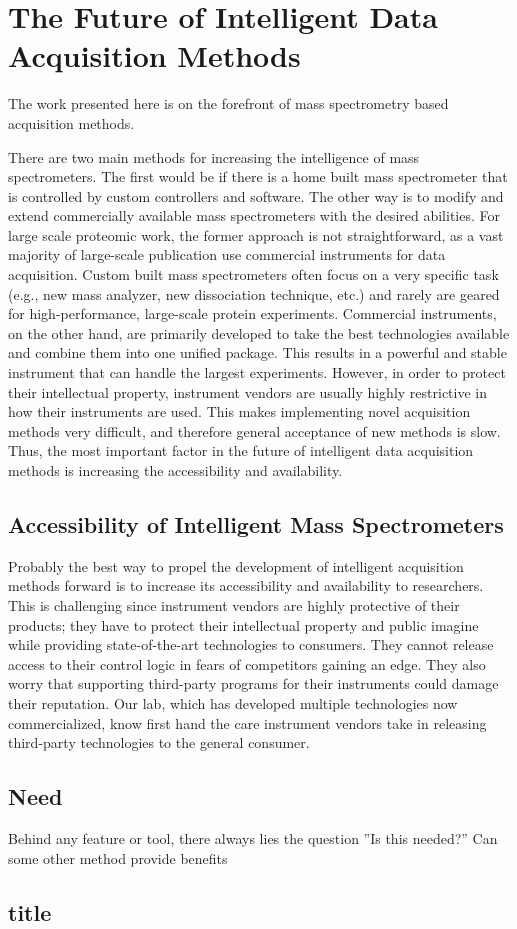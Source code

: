 \chapter{The Future of Intelligent Data Acquisition Methods}

The work presented here is on the forefront of mass spectrometry based acquisition methods. 

There are two main methods for increasing the intelligence of mass spectrometers. The first would be if there is a home built mass spectrometer that is controlled by custom controllers and software. The other way is to modify and extend commercially available mass spectrometers with the desired abilities. For large scale proteomic work, the former approach is not straightforward, as a vast majority of large-scale publication use commercial instruments for data acquisition. Custom built mass spectrometers often focus on a very specific task (e.g., new mass analyzer, new dissociation technique, etc.) and rarely are geared for high-performance, large-scale protein experiments. Commercial instruments, on the other hand, are primarily developed to take the best technologies available and combine them into one unified package. This results in a powerful and stable instrument that can handle the largest experiments. However, in order to protect their intellectual property, instrument vendors are usually highly restrictive in how their instruments are used. This makes implementing novel acquisition methods very difficult, and therefore general acceptance of new methods is slow. Thus, the most important factor in the future of intelligent data acquisition methods is increasing the accessibility and availability.

\section{Accessibility of Intelligent Mass Spectrometers}
Probably the best way to propel the development of intelligent acquisition methods forward is to increase its accessibility and availability to researchers. This is challenging since instrument vendors are highly protective of their products; they have to protect their intellectual property and public imagine while providing state-of-the-art technologies to consumers. They cannot release access to their control logic in fears of competitors gaining an edge. They also worry that supporting third-party programs for their instruments could damage their reputation. Our lab, which has developed multiple technologies now commercialized, know first hand the care instrument vendors take in releasing third-party technologies to the general consumer. 




\section*{Need}
Behind any feature or tool, there always lies the question ''Is this needed?'' Can some other method provide benefits 


\section*{title}
